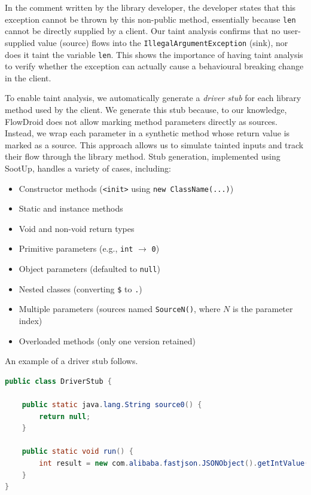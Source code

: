 In the comment written by the library developer, the developer states that this exception cannot be thrown by this non-public method, essentially because \texttt{len} cannot be directly supplied by a client. Our taint analysis confirms that no user-supplied value (source) flows into the \texttt{IllegalArgumentException} (sink), nor does it taint the variable \texttt{len}. This shows the importance of having taint analysis to verify whether the exception can actually cause a behavioural breaking change in the client.

To enable taint analysis, we automatically generate a \textit{driver stub} for each library method used by the client. We generate this stub because, to our knowledge, FlowDroid does not allow marking method parameters directly as sources. Instead, we wrap each parameter in a synthetic method whose return value is marked as a source. This approach allows us to simulate tainted inputs and track their flow through the library method. Stub generation, implemented using SootUp, handles a variety of cases, including:
\begin{itemize}
  \item Constructor methods (\texttt{<init>} using \texttt{new ClassName(...)})
  \item Static and instance methods
  \item Void and non-void return types
  \item Primitive parameters (e.g., \texttt{int} $\rightarrow$ \texttt{0})
  \item Object parameters (defaulted to \texttt{null})
  \item Nested classes (converting \texttt{\$} to \texttt{.})
  \item Multiple parameters (sources named \texttt{SourceN()}, where $N$ is the parameter index)
  \item Overloaded methods (only one version retained)
\end{itemize}

An example of a driver stub follows.
\begin{lstlisting}[language=Java,breaklines=true,breakatwhitespace=false,basicstyle=\scriptsize\ttfamily]
public class DriverStub {

    public static java.lang.String source0() {
        return null;
    }

    public static void run() {
        int result = new com.alibaba.fastjson.JSONObject().getIntValue(source0());
    }
}
\end{lstlisting}

